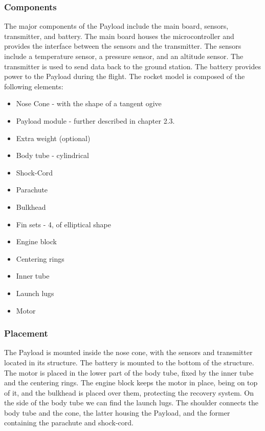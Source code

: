 \subsubsection{Components}

The major components of the Payload include the main board, sensors, transmitter, and battery. The main board houses the microcontroller and provides the interface between the sensors and the transmitter. The sensors include a temperature sensor, a pressure sensor, and an altitude sensor. The transmitter is used to send data back to the ground station. The battery provides power to the Payload during the flight. The rocket model is composed of the following elements:

\begin{itemize}
    \item Nose Cone - with the shape of a tangent ogive
    \item Payload module - further described in chapter 2.3.
    \item Extra weight (optional)
    \item Body tube - cylindrical
    \item Shock-Cord
    \item Parachute
    \item Bulkhead
    \item Fin sets - 4, of elliptical shape
    \item Engine block
    \item Centering rings
    \item Inner tube
    \item Launch lugs
    \item Motor
\end{itemize}

\subsubsection{Placement}

The Payload is mounted inside the nose cone, with the sensors and transmitter located in its structure. The battery is mounted to the bottom of the structure. The motor is placed in the lower part of the body tube, fixed by the inner tube and the centering rings. The engine block keeps the motor in place, being on top of it, and the bulkhead is placed over them, protecting the recovery system. On the side of the body tube we can find the launch lugs. The shoulder connects the body tube and the cone, the latter housing the Payload, and the former containing the parachute and shock-cord.

